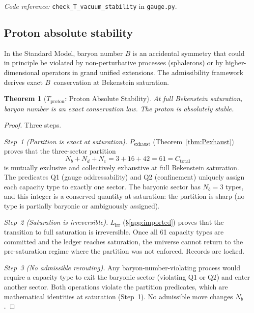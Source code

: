 \documentclass[11pt,a4paper]{article}
\newtheorem{theorem}{Theorem}[section]
\theoremstyle{definition}
\newcommand{\coderef}[2]{\smallskip\noindent\textit{Code reference:} \texttt{#1} in \texttt{#2}.}
\begin{document}
\coderef{check\_T\_vacuum\_stability}{gauge.py}


\subsection{Proton absolute stability}
\label{sec:proton_stability}

In the Standard Model, baryon number $B$ is an accidental symmetry
that could in principle be violated by non-perturbative processes
(sphalerons) or by higher-dimensional operators in grand unified
extensions.  The admissibility framework derives exact $B$~conservation
at Bekenstein saturation.

\begin{theorem}[$T_{\mathrm{proton}}$: Proton Absolute Stability]
\label{thm:proton}
At full Bekenstein saturation, baryon number is an exact conservation
law.  The proton is absolutely stable.
\end{theorem}

\begin{proof}
Three steps.

\textit{Step~1 (Partition is exact at saturation).}
$P_{\mathrm{exhaust}}$ (Theorem~\ref{thm:Pexhaust}) proves that the
three-sector partition
\[
  N_b + N_d + N_v = 3 + 16 + 42 = 61 = C_{\mathrm{total}}
\]
is mutually exclusive and collectively exhaustive at full Bekenstein
saturation.  The predicates Q1 (gauge addressability) and Q2
(confinement) uniquely assign each capacity type to exactly one sector.
The baryonic sector has $N_b = 3$ types, and this integer is a
conserved quantity at saturation: the partition is sharp (no type is
partially baryonic or ambiguously assigned).

\textit{Step~2 (Saturation is irreversible).}
$L_{\mathrm{irr}}$ (\S\ref{app:imported}) proves that the
transition to full saturation is irreversible.  Once all 61 capacity
types are committed and the ledger reaches saturation, the universe
cannot return to the pre-saturation regime where the partition was
not enforced.  Records are locked.

\textit{Step~3 (No admissible rerouting).}
Any baryon-number-violating process would require a capacity type to
exit the baryonic sector (violating Q1 or Q2) and enter another sector.
Both operations violate the partition predicates, which are mathematical
identities at saturation (Step~1).  No admissible move changes $N_b$.
\end{proof}
\end{document}
